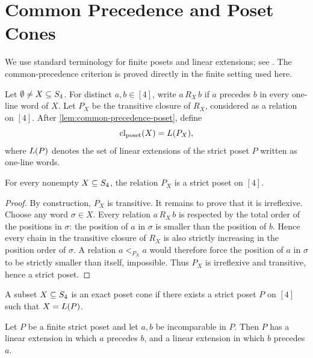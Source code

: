 \section{Common Precedence and Poset Cones}
\label{sec:common-precedence}

We use standard terminology for finite posets and linear extensions; see \cite{Stanley2012EC1,Trotter1992}. The common-precedence criterion is proved directly in the finite setting used here.

\begin{definition}
\label{def:common-precedence}
Let \(\emptyset\ne X\subseteq S_4\). For distinct \(a,b\in[4]\), write \(a\,R_X\,b\) if \(a\) precedes \(b\) in every one-line word of \(X\). Let \(P_X\) be the transitive closure of \(R_X\), considered as a relation on \([4]\). After \cref{lem:common-precedence-poset}, define
\[
  \operatorname{cl}_{\mathrm{poset}}(X)=L(P_X),
\]
where \(L(P)\) denotes the set of linear extensions of the strict poset \(P\) written as one-line words.
\end{definition}

\begin{lemma}
\label{lem:common-precedence-poset}
For every nonempty \(X\subseteq S_4\), the relation \(P_X\) is a strict poset on \([4]\).
\end{lemma}

\begin{proof}
By construction, \(P_X\) is transitive. It remains to prove that it is irreflexive. Choose any word \(\sigma\in X\). Every relation \(a\,R_X\,b\) is respected by the total order of the positions in \(\sigma\): the position of \(a\) in \(\sigma\) is smaller than the position of \(b\). Hence every chain in the transitive closure of \(R_X\) is also strictly increasing in the position order of \(\sigma\). A relation \(a<_{P_X}a\) would therefore force the position of \(a\) in \(\sigma\) to be strictly smaller than itself, impossible. Thus \(P_X\) is irreflexive and transitive, hence a strict poset.
\end{proof}

\begin{definition}
\label{def:exact-poset-cone}
A subset \(X\subseteq S_4\) is an exact poset cone if there exists a strict poset \(P\) on \([4]\) such that \(X=L(P)\).
\end{definition}

\begin{lemma}
\label{lem:finite-extension-separation}
Let \(P\) be a finite strict poset and let \(a,b\) be incomparable in \(P\). Then \(P\) has a linear extension in which \(a\) precedes \(b\), and a linear extension in which \(b\) precedes \(a\).
\end{lemma}

